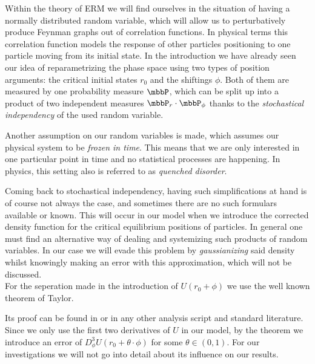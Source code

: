 % 

% 


Within the theory of ERM we will find ourselves in the situation of having a normally distributed random variable, which will allow us to perturbatively produce Feynman graphs out of correlation functions. In physical terms this correlation function models the response of other particles positioning to one particle moving from its initial state. In the introduction we have already seen our idea of reparametrizing the phase space using two types of position arguments: the critical initial states $r_0$ and the shiftings $\phi$. Both of them are measured by one probability measure $\mbbP$, which can be split up into a product of two independent measures $\mbbP_r\cdot \mbbP_\phi$ thanks to the \emph{stochastical independency} of the used random variable.

Another assumption on our random variables is made, which assumes our physical system to be \emph{frozen in time}. This means that we are only interested in one particular point in time and no statistical processes are happening. In physics, this setting also is referred to as \emph{quenched disorder}.

Coming back to stochastical independency, having such simplifications at hand is of course not always the case, and sometimes there are no such formulars available or known. This will occur in our model when we introduce the corrected density function for the critical equilibrium positions of particles. In general one must find an alternative way of dealing and systemizing such products of random variables. In our case we will evade this problem by \emph{gaussianizing} said density whilst knowingly making an error with this approximation, which will not be discussed. \\ 

For the seperation made in the introduction of $U(r_0 + \phi)$ we use the well known theorem of Taylor.

Its proof can be found in \cite{skript:JunkAna2} or in any other analysis script and standard literature. Since we only use the first two derivatives of $U$ in our model, by the theorem we introduce an error of $D_\phi^{3}U(r_0 + \theta\cdot \phi)$ for some $\theta\in(0,1)$. For our investigations we will not go into detail about its influence on our results. \\

